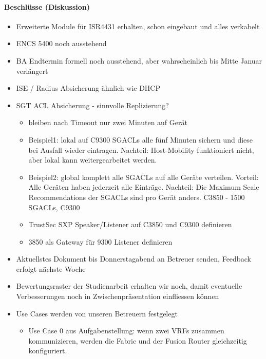 \paragraph{Beschlüsse (Diskussion)}
\begin{itemize}	
	\item Erweiterte Module für ISR4431 erhalten, schon eingebaut und alles verkabelt
	\item ENCS 5400 noch ausstehend
	\item BA Endtermin formell noch ausstehend, aber wahrscheinlich bis Mitte Januar verlängert	
	\item ISE / Radius Absicherung ähnlich wie DHCP
	\item SGT ACL Absicherung - sinnvolle Replizierung?
	\begin{itemize}
		\item bleiben nach Timeout nur zwei Minuten auf Gerät
		\item Beispiel1: lokal auf C9300 SGACLs alle fünf Minuten sichern und diese bei Ausfall wieder eintragen. Nachteil: Host-Mobility funktioniert nicht, aber lokal kann weitergearbeitet werden.
		\item Beispiel2: global komplett alle SGACLs auf alle Geräte verteilen. Vorteil: Alle Geräten haben jederzeit alle Einträge. Nachteil: Die Maximum Scale Recommendations der SGACLs sind pro Gerät anders. C3850 - 1500 SGACLs, C9300 
		\item TrustSec SXP Speaker/Listener auf C3850 und C9300 definieren
		\item 3850 als Gateway  für 9300 Listener definieren
	\end{itemize}
	\item Aktuellstes Dokument bis Donnerstagabend an Betreuer senden, Feedback erfolgt nächste Woche
	\item Bewertungsraster der Studienarbeit erhalten wir noch, damit eventuelle Verbesserungen noch in Zwischenpräsentation einfliessen können
	\item Use Cases werden von unseren Betreuern festgelegt
	\begin{itemize}
		\item Use Case 0 aus Aufgabenstellung: wenn zwei VRFs zusammen kommunizieren, werden die Fabric und der Fusion Router gleichzeitig konfiguriert.
	\end{itemize}
\end{itemize}


